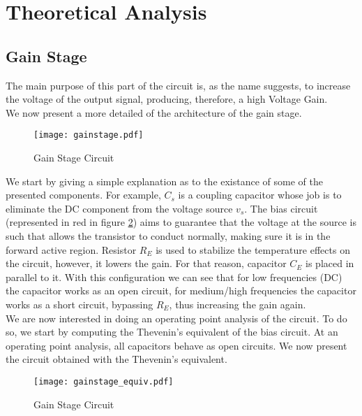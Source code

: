 \section{Theoretical Analysis}
\label{sec:theoretical}



\subsection{Gain Stage}
\par The main purpose of this part of the circuit is, as the name suggests, to increase the voltage of the output signal, producing, therefore, a high Voltage Gain.\\
We now present a more detailed of the architecture of the gain stage.

\begin{figure}[h!]
\centering
\texttt{[image: gainstage.pdf]}
\caption{Gain Stage Circuit}
\label{fig:gain_stage_circuit}
\end{figure}



We start by giving a simple explanation as to the existance of some of the presented components. For example, $C_s$ is a coupling capacitor whose job is to eliminate the DC component from the voltage source $v_s$. The bias circuit (represented in red in figure \ref{fig:gain_stage_circuit}) aims to guarantee that the voltage at the source is such that allows the transistor to conduct normally, making sure it is in the forward active region.
Resistor $R_E$ is used to stabilize the temperature effects on the circuit, however, it lowers the gain. For that reason, capacitor $C_E$ is placed in parallel to it. With this configuration we can see that for low frequencies (DC) the capacitor works as an open circuit, for medium/high frequencies the capacitor works as a short circuit, bypassing $R_E$, thus increasing the gain again.\\

We are now interested in doing an operating point analysis of the circuit. To do so, we start by computing the Thevenin's equivalent of the bias circuit. At an operating point analysis, all capacitors behave as open circuits. We now present the circuit obtained with the Thevenin's equivalent.


\begin{figure}[H]
\centering
\texttt{[image: gainstage\_equiv.pdf]}
\caption{Gain Stage Circuit}
\label{fig:gain_stage_circuit}
\end{figure}


